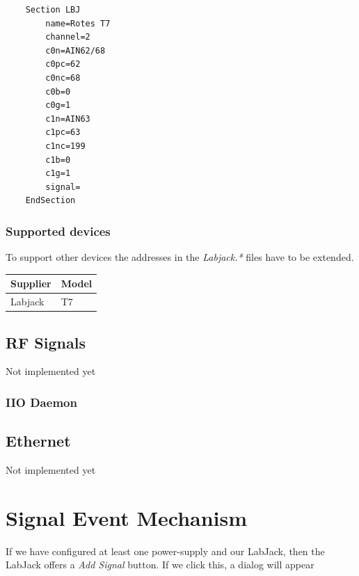 \documentclass[10pt,a4paper]{article}
\begin{document}
	\begin{lstlisting}
	Section LBJ
		name=Rotes T7
		channel=2
		c0n=AIN62/68
		c0pc=62
		c0nc=68
		c0b=0
		c0g=1
		c1n=AIN63
		c1pc=63
		c1nc=199
		c1b=0
		c1g=1
		signal=
	EndSection
	\end{lstlisting}
	
		\subsubsection{Supported devices}
		To support other devices the addresses in the \textit{Labjack.*} files have to be extended.
	
		\begin{table}[H]
		\centering
		\begin{tabular}{ll}
		\toprule
		Supplier			& Model \\ \midrule
		Labjack				& T7 \\
		\bottomrule
		\end{tabular}			
		\end{table}	

	\subsection{RF Signals}
	Not implemented yet
	
		\subsubsection{IIO Daemon}
		
	\subsection{Ethernet}
	Not implemented yet

\section{Signal Event Mechanism}
\label{c:signal_event_mechanism}


\bigbreak

If we have configured at least one power-supply and our LabJack, then the LabJack offers a \textit{Add Signal} button. If we click this, a dialog will appear

\appendix
\end{document}
